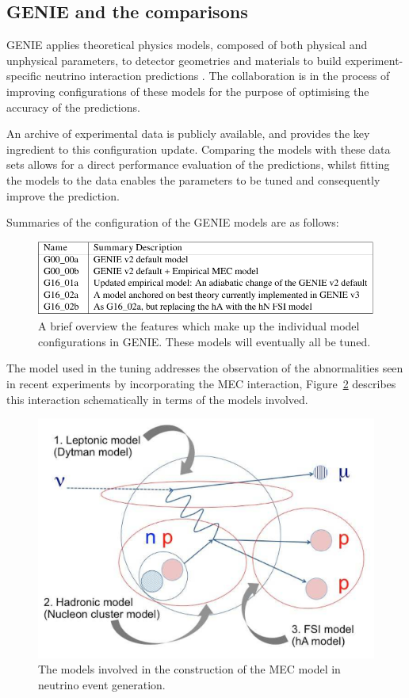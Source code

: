 
\subsection{GENIE and the comparisons}
GENIE applies theoretical physics models, composed of both physical and unphysical parameters, to detector geometries and materials to build experiment-specific neutrino interaction predictions \cite{genie}. The collaboration is in the process of improving configurations of these models for the purpose of optimising the accuracy of the predictions.

    An archive of experimental data is publicly available, and provides the key ingredient to this configuration update. Comparing the models with these data sets allows for a direct performance evaluation of the predictions, whilst fitting the models to the data enables the parameters to be tuned and consequently improve the prediction.

Summaries of the configuration of the GENIE models are as follows:

\begin{figure}[h!]
    \centering
    \includegraphics[width=\textwidth]{images/model_summaries.pdf}
    \caption{A brief overview the features which make up the individual model configurations in GENIE. These models will eventually all be tuned.}
    \label{fig:modelConfigs}
\end{figure}


The model used in the tuning addresses the observation of the abnormalities seen in recent experiments by incorporating the MEC interaction, Figure~\ref{fig:MECSchem} \cite{MEC} describes this interaction schematically in terms of the models involved. 

\begin{figure}[h!]
    \centering
    \includegraphics[width=.6\textwidth]{images/mec_model_genie.png}
    \caption{The models involved in the construction of the MEC model in neutrino event generation.}
    \label{fig:MECSchem}
\end{figure}

